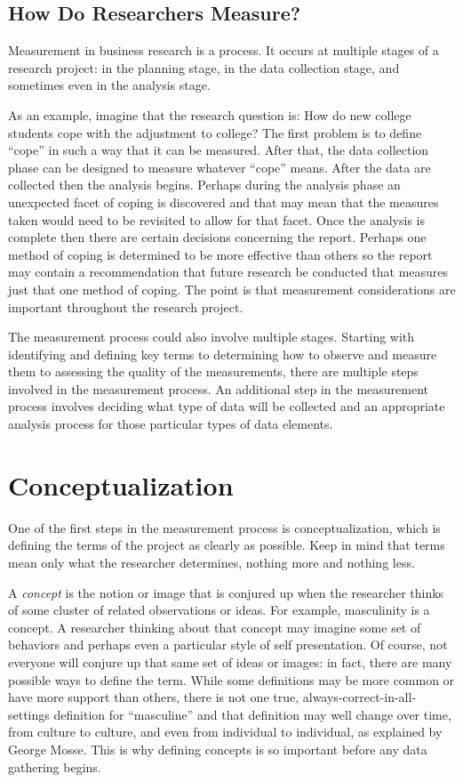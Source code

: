 \subsection{How Do Researchers Measure?}

Measurement in business research is a process. It occurs at multiple stages of a research project: in the planning stage, in the data collection stage, and sometimes even in the analysis stage. 

As an example, imagine that the research question is: How do new college students cope with the adjustment to college? The first problem is to define ``cope'' in such a way that it can be measured. After that, the data collection phase can be designed to measure whatever ``cope'' means. After the data are collected then the analysis begins. Perhaps during the analysis phase an unexpected facet of coping is discovered and that may mean that the measures taken would need to be revisited to allow for that facet. Once the analysis is complete then there are certain decisions concerning the report. Perhaps one method of coping is determined to be more effective than others so the report may contain a recommendation that future research be conducted that measures just that one method of coping. The point is that measurement considerations are important throughout the research project.

The measurement process could also involve multiple stages. Starting with identifying and defining key terms to determining how to observe and measure them to assessing the quality of the measurements, there are multiple steps involved in the measurement process. An additional step in the measurement process involves deciding what type of data will be collected and an appropriate analysis process for those particular types of data elements. 

\section{Conceptualization}

One of the first steps in the measurement process is conceptualization, which is defining the terms of the project as clearly as possible. Keep in mind that terms mean only what the researcher determines, nothing more and nothing less.

A \textit{concept} is the notion or image that is conjured up when the researcher thinks of some cluster of related observations or ideas. For example, masculinity is a concept. A researcher thinking about that concept may imagine some set of behaviors and perhaps even a particular style of self presentation. Of course, not everyone will conjure up that same set of ideas or images: in fact, there are many possible ways to define the term. While some definitions may be more common or have more support than others, there is not one true, always-correct-in-all-settings definition for ``masculine'' and that definition may well change over time, from culture to culture, and even from individual to individual, as explained by George Mosse\cite{george1996image}. This is why defining concepts is so important before any data gathering begins.

